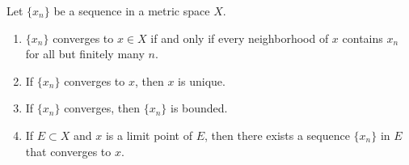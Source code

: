   \begin{theorem}
    Let $\{x_n\}$ be a sequence in a metric space $X$. 
    \begin{enumerate}
      \item $\{x_n\}$ converges to $x \in X$ if and only if every neighborhood of $x$ contains $x_n$ for all but finitely many $n$. 
      \item If $\{x_n\}$ converges to $x$, then $x$ is unique. 
      \item If $\{x_n\}$ converges, then $\{x_n\}$ is bounded. 
      \item If $E \subset X$ and $x$ is a limit point of $E$, then there exists a sequence $\{x_n\}$ in $E$ that converges to $x$. 
    \end{enumerate}
  \end{theorem}
